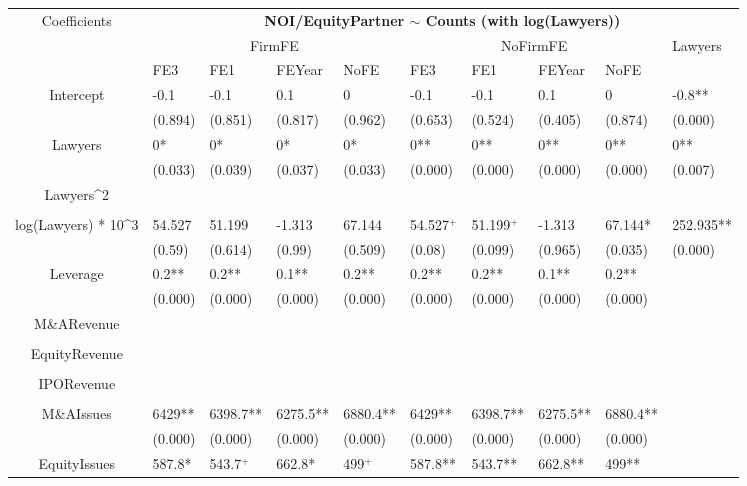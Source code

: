 \documentclass{article}
\begin{document}
\begin{table}[H]
\centering
\begin{tabular}{|clllllllll|}
\hline
\multirow{3}{*}{Coefficients} & \multicolumn{9}{c|}{\textbf{NOI/EquityPartner $\sim$ Counts (with log(Lawyers))}} \\
\cline{2-10}
& \multicolumn{4}{c}{FirmFE} & \multicolumn{4}{c}{NoFirmFE} & \multirow{2}{*}{Lawyers} \\
\cline{2-9}
& FE3 & FE1 & FEYear & NoFE & FE3 & FE1 & FEYear & NoFE &  \\
\hline
 
Intercept & -0.1 & -0.1 & 0.1 & 0 & -0.1 & -0.1 & 0.1 & 0 & -0.8** \\ 
   & (0.894) & (0.851) & (0.817) & (0.962) & (0.653) & (0.524) & (0.405) & (0.874) & (0.000) \\ 
  Lawyers & 0* & 0* & 0* & 0* & 0** & 0** & 0** & 0** & 0** \\ 
   & (0.033) & (0.039) & (0.037) & (0.033) & (0.000) & (0.000) & (0.000) & (0.000) & (0.007) \\ 
  Lawyers^2 &  &  &  &  &  &  &  &  &  \\ 
   &  &  &  &  &  &  &  &  &  \\ 
  log(Lawyers) * 10^3 & 54.527 & 51.199 & -1.313 & 67.144 & 54.527$^{+}$ & 51.199$^{+}$ & -1.313 & 67.144* & 252.935** \\ 
   & (0.59) & (0.614) & (0.99) & (0.509) & (0.08) & (0.099) & (0.965) & (0.035) & (0.000) \\ 
  Leverage & 0.2** & 0.2** & 0.1** & 0.2** & 0.2** & 0.2** & 0.1** & 0.2** &  \\ 
   & (0.000) & (0.000) & (0.000) & (0.000) & (0.000) & (0.000) & (0.000) & (0.000) &  \\ 
  M\&ARevenue &  &  &  &  &  &  &  &  &  \\ 
   &  &  &  &  &  &  &  &  &  \\ 
  EquityRevenue &  &  &  &  &  &  &  &  &  \\ 
   &  &  &  &  &  &  &  &  &  \\ 
  IPORevenue &  &  &  &  &  &  &  &  &  \\ 
   &  &  &  &  &  &  &  &  &  \\ 
  M\&AIssues & 6429** & 6398.7** & 6275.5** & 6880.4** & 6429** & 6398.7** & 6275.5** & 6880.4** &  \\ 
   & (0.000) & (0.000) & (0.000) & (0.000) & (0.000) & (0.000) & (0.000) & (0.000) &  \\ 
  EquityIssues & 587.8* & 543.7$^{+}$ & 662.8* & 499$^{+}$ & 587.8** & 543.7** & 662.8** & 499** &  \\ 

\end{tabular}
\end{table}
\end{document}
